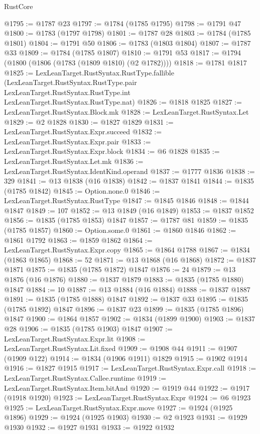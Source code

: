 \begin{lexlean}{RustCore}
\begin{coremodule}
@1795 := @1787 @23
@1797 := @1784 (@1785 @1795)
@1798 := @1791 @47
@1800 := @1783 (@1797 @1798)
@1801 := @1787 @28
@1803 := @1784 (@1785 @1801)
@1804 := @1791 @50
@1806 := @1783 (@1803 @1804)
@1807 := @1787 @33
@1809 := @1784 (@1785 @1807)
@1810 := @1791 @53
@1817 := @1794 (@1800 (@1806 (@1783 (@1809 @1810) (@2 @1782))))
@1818 := @1781 @1817
@1825 := LexLeanTarget.RustSyntax.RustType.fallible
    (LexLeanTarget.RustSyntax.RustType.pair
      LexLeanTarget.RustSyntax.RustType.int
      LexLeanTarget.RustSyntax.RustType.nat)
@1826 := @1818 @1825
@1827 := LexLeanTarget.RustSyntax.Block.mk
@1828 := LexLeanTarget.RustSyntax.Let
@1829 := @2 @1828
@1830 := @1827 @1829
@1831 := LexLeanTarget.RustSyntax.Expr.succeed
@1832 := LexLeanTarget.RustSyntax.Expr.pair
@1833 := LexLeanTarget.RustSyntax.Expr.block
@1834 := @6 @1828
@1835 := LexLeanTarget.RustSyntax.Let.mk
@1836 := LexLeanTarget.RustSyntax.IdentKind.operand
@1837 := @1777 @1836
@1838 := 329
@1841 := @13 @1838 (@16 @1838)
@1842 := @1837 @1841
@1844 := @1835 (@1785 @1842)
@1845 := Option.none.{0}
@1846 := LexLeanTarget.RustSyntax.RustType
@1847 := @1845 @1846
@1848 := @1844 @1847
@1849 := 107
@1852 := @13 @1849 (@16 @1849)
@1853 := @1837 @1852
@1856 := @1835 (@1785 @1853) @1847
@1857 := @1787 @81
@1859 := @1835 (@1785 @1857)
@1860 := Option.some.{0}
@1861 := @1860 @1846
@1862 := @1861 @1792
@1863 := @1859 @1862
@1864 := LexLeanTarget.RustSyntax.Expr.copy
@1865 := @1864 @1788
@1867 := @1834 (@1863 @1865)
@1868 := 52
@1871 := @13 @1868 (@16 @1868)
@1872 := @1837 @1871
@1875 := @1835 (@1785 @1872) @1847
@1876 := 24
@1879 := @13 @1876 (@16 @1876)
@1880 := @1837 @1879
@1883 := @1835 (@1785 @1880) @1847
@1884 := 10
@1887 := @13 @1884 (@16 @1884)
@1888 := @1837 @1887
@1891 := @1835 (@1785 @1888) @1847
@1892 := @1837 @33
@1895 := @1835 (@1785 @1892) @1847
@1896 := @1837 @23
@1899 := @1835 (@1785 @1896) @1847
@1900 := @1864 @1857
@1902 := @1834 (@1899 @1900)
@1903 := @1837 @28
@1906 := @1835 (@1785 @1903) @1847
@1907 := LexLeanTarget.RustSyntax.Expr.lit
@1908 := LexLeanTarget.RustSyntax.Lit.fixed
@1909 := @1908 @44
@1911 := @1907 (@1909 @122)
@1914 := @1834 (@1906 @1911) @1829
@1915 := @1902 @1914
@1916 := @1827 @1915
@1917 := LexLeanTarget.RustSyntax.Expr.call
@1918 := LexLeanTarget.RustSyntax.Callee.runtime
@1919 := LexLeanTarget.RustSyntax.Item.bitAnd
@1920 := @1919 @44
@1922 := @1917 (@1918 @1920)
@1923 := LexLeanTarget.RustSyntax.Expr
@1924 := @6 @1923
@1925 := LexLeanTarget.RustSyntax.Expr.move
@1927 := @1924 (@1925 @1896)
@1929 := @1924 (@1925 @1903)
@1930 := @2 @1923
@1931 := @1929 @1930
@1932 := @1927 @1931
@1933 := @1922 @1932

\end{coremodule}
\end{lexlean}
